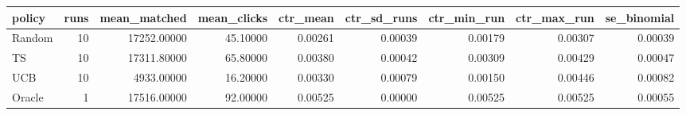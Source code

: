 \begin{tabular}{lrrrrrrrr}
\toprule
policy & runs & mean\_matched & mean\_clicks & ctr\_mean & ctr\_sd\_runs & ctr\_min\_run & ctr\_max\_run & se\_binomial \\
\midrule
Random & 10 & 17252.00000 & 45.10000 & 0.00261 & 0.00039 & 0.00179 & 0.00307 & 0.00039 \\
TS & 10 & 17311.80000 & 65.80000 & 0.00380 & 0.00042 & 0.00309 & 0.00429 & 0.00047 \\
UCB & 10 & 4933.00000 & 16.20000 & 0.00330 & 0.00079 & 0.00150 & 0.00446 & 0.00082 \\
Oracle & 1 & 17516.00000 & 92.00000 & 0.00525 & 0.00000 & 0.00525 & 0.00525 & 0.00055 \\
\bottomrule
\end{tabular}
